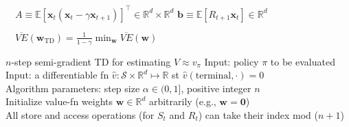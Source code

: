 \documentclass[twocolumn]{article}
\begin{document}
$\quad A \equiv \mathbb E[\mathbf x_t (\mathbf x_t - \gamma \mathbf x_{t+1})]^\top \in \mathbb R^d \times \mathbb R^d$ \hfill $\mathbf b \equiv \mathbb E[R_{t+1} \mathbf x_t] \in \mathbb R^d$

$\quad \overline{VE}(\mathbf w_{\text{TD}}) = \frac{1}{1-\gamma} \min_{\mathbf w} \overline{VE}(\mathbf w)$



\newpage

\begin{mydef}{$n$-step semi-gradient TD for estimating $V \approx v_\pi$}{}
    Input: policy $\pi$ to be evaluated \\
    Input: a differentiable fn $\hat v: \mathcal S \times \mathbb R^d \mapsto \mathbb R$ st $\hat v(\text{terminal}, \cdot) = 0$ \\
    Algorithm parameters: step size $\alpha \in (0, 1]$, positive integer $n$ \\
    Initialize value-fn weights $\mathbf w \in \mathbb R^d$ arbitrarily (e.g., $\mathbf w = \mathbf 0$) \\
    All store and access operations (for $S_t$ and $R_t$) can take their index mod ($n+1$) \\
    

\end{mydef}
\end{document}
